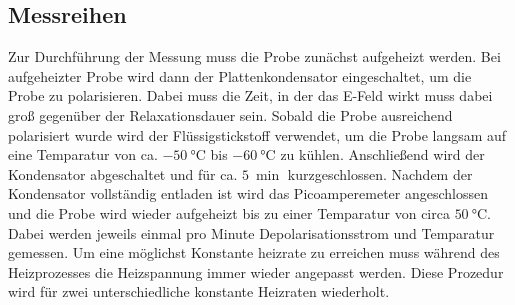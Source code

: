 \subsection{Messreihen}
Zur Durchführung der Messung muss die Probe zunächst aufgeheizt werden. Bei aufgeheizter Probe wird dann der Plattenkondensator eingeschaltet, um die Probe zu polarisieren. 
Dabei muss die Zeit, in der das E-Feld wirkt muss dabei groß gegenüber der Relaxationsdauer sein. 
Sobald die Probe ausreichend polarisiert wurde wird der Flüssigstickstoff verwendet, um die Probe langsam auf eine Temparatur von ca. $\SI{-50}{\celsius}$ bis $\SI{-60}{\celsius}$ zu kühlen. 
Anschließend wird der Kondensator abgeschaltet und für ca. $\SI{5}{\min}$ kurzgeschlossen. 
Nachdem der Kondensator vollständig entladen ist wird das Picoamperemeter angeschlossen und die Probe wird wieder aufgeheizt bis zu einer Temparatur von circa $\SI{50}{\celsius}$. 
Dabei werden jeweils einmal pro Minute Depolarisationsstrom und Temparatur gemessen. Um eine möglichst Konstante heizrate zu erreichen muss während des Heizprozesses die Heizspannung immer wieder angepasst werden. 
Diese Prozedur wird für zwei unterschiedliche konstante Heizraten wiederholt.